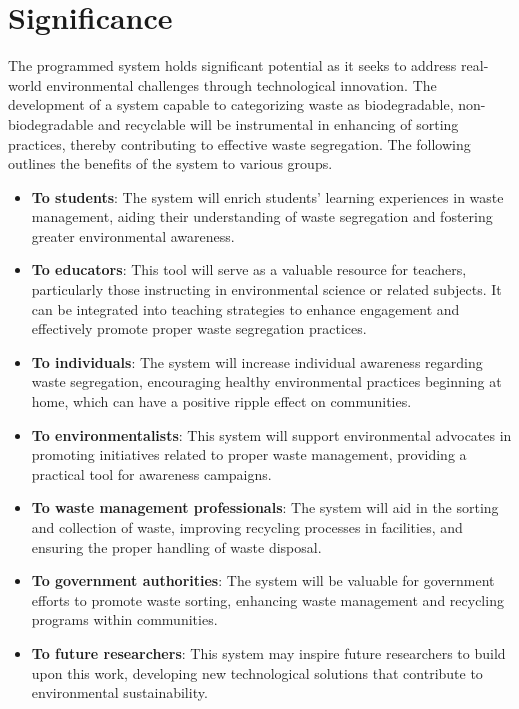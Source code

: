 \section{Significance}
	The programmed system holds significant potential as it seeks to address real-world environmental challenges through technological innovation. The development of a system capable to categorizing waste as biodegradable, non-biodegradable and recyclable will be instrumental in enhancing of sorting practices, thereby contributing to effective waste segregation. The following outlines the benefits of the system to various groups.
	
\begin{itemize}
	\item \textbf{To students}: The system will enrich students' learning experiences in waste management, aiding their understanding of waste segregation and fostering greater environmental awareness.
	
	\item \textbf{To educators}: This tool will serve as a valuable resource for teachers, particularly those instructing in environmental science or related subjects. It can be integrated into teaching strategies to enhance engagement and effectively promote proper waste segregation practices.
	
	\item \textbf{To individuals}: The system will increase individual awareness regarding waste segregation, encouraging healthy environmental practices beginning at home, which can have a positive ripple effect on communities.
	
	\item \textbf{To environmentalists}: This system will support environmental advocates in promoting initiatives related to proper waste management, providing a practical tool for awareness campaigns.
	
	\item \textbf{To waste management professionals}: The system will aid in the sorting and collection of waste, improving recycling processes in facilities, and ensuring the proper handling of waste disposal.
	
	\item \textbf{To government authorities}: The system will be valuable for government efforts to promote waste sorting, enhancing waste management and recycling programs within communities.
	
	\item \textbf{To future researchers}: This system may inspire future researchers to build upon this work, developing new technological solutions that contribute to environmental sustainability.
\end{itemize}
	